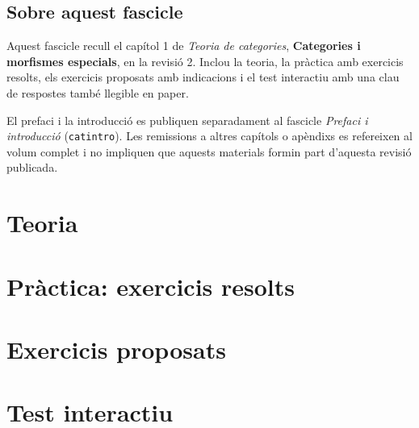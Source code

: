 \documentclass[12pt,a4paper,oneside]{book}
\begin{document}
\pagecolor{fons!20}
\hypermetadata

\frontmatter
\maketitle
\tableofcontents
\let\cleardoublepage\clearpage

\chapter*{Sobre aquest fascicle}
Aquest fascicle recull el capítol 1 de \emph{Teoria de categories},
\textbf{Categories i morfismes especials}, en la revisió 2.
Inclou la teoria, la pràctica amb exercicis resolts, els exercicis
proposats amb indicacions i el test interactiu amb una clau de respostes
 també llegible en paper.

El prefaci i la introducció es publiquen separadament al fascicle
\emph{Prefaci i introducció} (\texttt{catintro}). Les remissions a altres
capítols o apèndixs es refereixen al volum complet i no impliquen que
 aquests materials formin part d'aquesta revisió publicada.

\mainmatter
\part{Teoria}
\setcounter{chapter}{0}


\part{Pràctica: exercicis resolts}
\setcounter{chapter}{0}


\part{Exercicis proposats}
\setcounter{chapter}{0}


\part{Test interactiu}
\setcounter{chapter}{0}


\backmatter

\printindex
\end{document}
